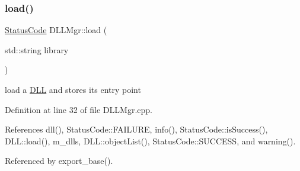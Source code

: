 \subsubsection{\texorpdfstring{load()}{load()}}
{\footnotesize\ttfamily \hyperlink{classStatusCode}{Status\+Code} D\+L\+L\+Mgr\+::load (\begin{DoxyParamCaption}\item[{std\+::string}]{library }\end{DoxyParamCaption})}

load a \hyperlink{classDLL}{D\+LL} and stores its entry point 

Definition at line 32 of file D\+L\+L\+Mgr.\+cpp.



References dll(), Status\+Code\+::\+F\+A\+I\+L\+U\+RE, info(), Status\+Code\+::is\+Success(), D\+L\+L\+::load(), m\+\_\+dlls, D\+L\+L\+::object\+List(), Status\+Code\+::\+S\+U\+C\+C\+E\+SS, and warning().



Referenced by export\+\_\+base().


